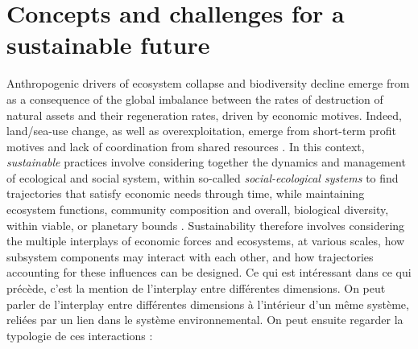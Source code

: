 \section*{Concepts and challenges for a sustainable future}

Anthropogenic drivers of ecosystem collapse and biodiversity decline emerge from as a consequence of the global imbalance between the rates of destruction of natural assets and their regeneration rates, driven by economic motives. Indeed, land/sea-use change, as well as overexploitation, emerge from short-term profit motives and lack of coordination from shared resources \citep{clark_profit_1973}. In this context, \textit{sustainable} practices involve considering together the dynamics and management of ecological and social system, within so-called \textit{social-ecological systems} \citep{Ostrom2009} to find trajectories that satisfy economic needs through time, while maintaining ecosystem functions, community composition and overall, biological diversity, within viable, or planetary bounds \citep{Dasgupta2007, steffen_2015_planetary}. Sustainability therefore involves considering the multiple interplays of economic forces and ecosystems, at various scales, how subsystem components may interact with each other, and how trajectories accounting for these influences can be designed. 
Ce qui est intéressant dans ce qui précède, c'est la mention de l'interplay entre différentes dimensions. 
On peut parler de l'interplay entre différentes dimensions à l'intérieur d'un même système, reliées par un lien dans le système environnemental. 
On peut ensuite regarder la typologie de ces interactions : 



